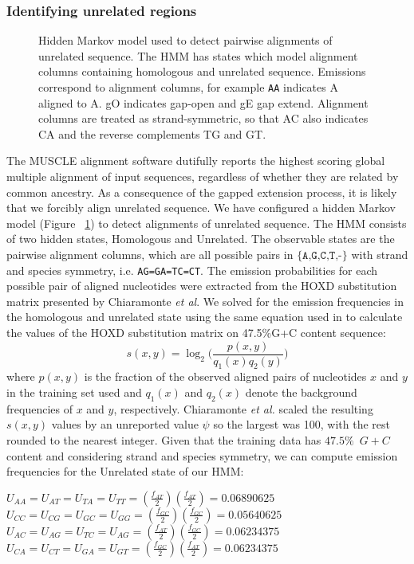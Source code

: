 \documentclass{ws-procs975x65}
\begin{document}
\subsubsection{Identifying unrelated regions}
\begin{figure}[t]
\centering {}
\caption{Hidden Markov model used to detect pairwise alignments of unrelated
sequence. The HMM has states which model alignment columns containing
homologous and unrelated sequence.  Emissions correspond to alignment
columns, for example \texttt{AA} indicates A aligned to A.  gO
indicates gap-open and gE gap extend. Alignment columns are treated as
strand-symmetric, so that AC also indicates CA and the reverse
complements TG and GT.}
\label{fig-hmm}\vspace{-0.2cm}
\end{figure}
The MUSCLE alignment software dutifully reports the highest scoring
global multiple alignment of input sequences, regardless of whether
they are related by common ancestry. As a consequence of the gapped
extension process, it is likely that we forcibly align unrelated
sequence. We have configured a hidden Markov model (Figure
~\ref{fig-hmm}) to detect alignments of unrelated sequence. The HMM
consists of two hidden states, Homologous and Unrelated. The
observable states are the pairwise alignment columns, which are all
possible pairs in $\texttt{{\{A,G,C,T,-\}}}$ with strand and species
symmetry, i.e. \texttt{AG=GA=TC=CT}.  The emission probabilities for
each possible pair of aligned nucleotides were extracted from the HOXD
substitution matrix presented by Chiaramonte \textit{et al}\cite{hoxd}. 
We solved for the emission frequencies in the
homologous and unrelated state using the same equation used in to
calculate the values of the HOXD substitution matrix on 47.5\%G+C
content sequence\cite{hoxd}:
\begin{equation}
s(x,y)= \log_{2}{\Bigg(\frac{p(x,y)}{q_{1}(x)q_{2}(y)}\Bigg)}
\end{equation}
{w}here $p(x,y)$ is the fraction of the observed aligned pairs of
nucleotides $x$ and $y$ in the training set used and $q_{1}(x)$ and
$q_{2}(x)$ denote the background frequencies of $x$ and $y$,
respectively. Chiaramonte \textit{et al.} scaled the resulting
$s(x,y)$ values by an unreported value $\psi$ so the largest was 100,
with the rest rounded to the nearest integer.  Given that the training
data has $47.5\%$~$G+C$ content and considering strand and species
symmetry, we can compute emission frequencies for the Unrelated state
of our HMM:
\begin{center}$U_{AA}=U_{AT}=U_{TA}=U_{TT}=(\frac{f_{AT}}{2})(\frac{f_{AT}}{2})
= 0.06890625$ \\
$U_{CC}=U_{CG}=U_{GC}=U_{GG}=(\frac{f_{GC}}{2})(\frac{f_{GC}}{2}) =
0.05640625$ \\
$U_{AC}=U_{AG}=U_{TC}=U_{AG}=(\frac{f_{AT}}{2})(\frac{f_{GC}}{2}) =
0.06234375$ \\
$U_{CA}=U_{CT}=U_{GA}=U_{GT}=(\frac{f_{GC}}{2})(\frac{f_{AT}}{2}) =
0.06234375$ \\
\end{center}
\end{document}
